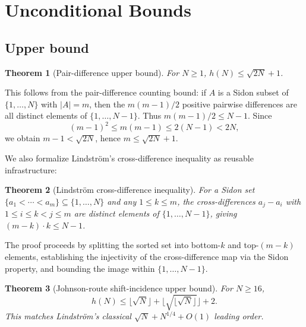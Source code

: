 \documentclass[11pt,a4paper]{article}
\newtheorem{theorem}{Theorem}[section]
\begin{document}
\section{Unconditional Bounds}
\label{sec:bounds}

\subsection{Upper bound}

\begin{theorem}[Pair-difference upper bound]
\label{thm:upper-bound}
For $N \ge 1$, $h(N) \le \sqrt{2N} + 1$.
\end{theorem}

This follows from the pair-difference counting bound: if \(A\) is a Sidon
subset of \(\{1,\dots,N\}\) with \(|A|=m\), then the \(m(m-1)/2\) positive
pairwise differences are all distinct elements of \(\{1,\dots,N-1\}\).
Thus \(m(m-1)/2\le N-1\).  Since
\[
  (m-1)^2 \le m(m-1) \le 2(N-1) < 2N,
\]
we obtain \(m-1<\sqrt{2N}\), hence \(m\le\sqrt{2N}+1\).

We also formalize Lindstr\"om's cross-difference inequality as reusable
infrastructure:

\begin{theorem}[Lindstr\"om cross-difference inequality]
\label{thm:lindstrom-cross}
For a Sidon set $\{a_1 < \cdots < a_m\} \subseteq \{1,\dots,N\}$ and any
$1 \le k \le m$, the cross-differences $a_j - a_i$ with $1 \le i \le k < j \le m$ are
distinct elements of $\{1,\dots,N-1\}$, giving $(m-k) \cdot k \le N - 1$.
\end{theorem}

The proof proceeds by splitting the sorted set into bottom-$k$ and top-$(m-k)$
elements, establishing the injectivity of the cross-difference map via the Sidon
property, and bounding the image within $\{1,\dots,N-1\}$.

\begin{theorem}[Johnson-route shift-incidence upper bound]
\label{thm:lindstrom-improved}
For $N \ge 16$,
\[
  h(N)\le \lfloor\sqrt{N}\rfloor+
        \lfloor\sqrt{\lfloor\sqrt{N}\rfloor}\rfloor+2.
\]
This matches Lindstr\"om's classical $\sqrt N+N^{1/4}+O(1)$ leading order.
\end{theorem}
\end{document}
